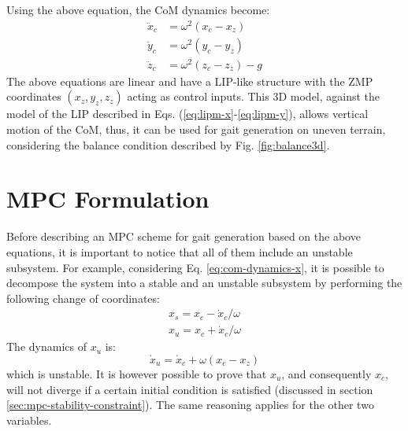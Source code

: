 Using the above equation, the CoM dynamics become:
\begin{align}
  \ddot{x}_c &= \omega^2 (x_c - x_z) \label{eq:com-dynamics-x} \\
  \ddot{y}_c &= \omega^2 (y_c - y_z) \label{eq:com-dynamics-y}\\
  \ddot{z}_c &= \omega^2 (z_c - z_z) - g \label{eq:com-dynamics-z}
\end{align}
The above equations are linear and have a LIP-like structure with the 
ZMP coordinates $(x_z, y_z, z_z)$ acting as control inputs. This 3D model,
against the model of the LIP described in Eqs.
(\ref{eq:lipm-x}-\ref{eq:lipm-y}), allows vertical motion of the CoM, thus,
it can be used for 
gait generation on uneven terrain, considering the balance condition 
described by Fig. \ref{fig:balance3d}.

\section{MPC Formulation}
Before describing an MPC scheme for gait generation based on the above 
equations, it is important to notice that all of them include an unstable 
subsystem. For example, considering Eq. \eqref{eq:com-dynamics-x}, it is 
possible to decompose the system into a stable and an unstable subsystem by 
performing the following change of coordinates:
\begin{align}
  x_s = x_c - \dot{x}_c / \omega \\
  x_u = x_c + \dot{x}_c / \omega
\end{align}
The dynamics of $x_u$ is:
\begin{equation}
  \dot{x}_u = \dot{x}_c + \omega (x_c - x_z)
\end{equation}
which is unstable. It is however possible to prove 
\cite{Lanari2014BoundednessII} that $x_u$, and consequently $x_c$, will not 
diverge if a certain initial condition is satisfied (discussed in section 
\ref{sec:mpc-stability-constraint}). The same 
reasoning applies for the other two variables.

